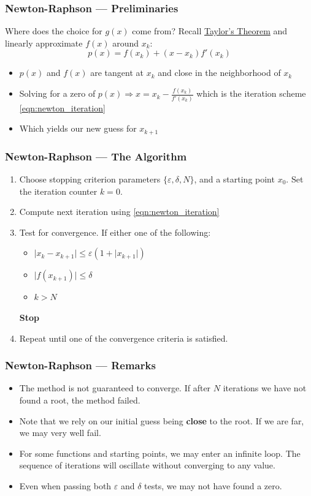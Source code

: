 \documentclass[11pt,xcolor={svgnames},aspectratio=169,usepdftitle=false,notheorems]{beamer}
\begin{document}
\begin{frame}
  \frametitle{Newton-Raphson --- Preliminaries}
Where does the choice for $g(x)$ come from? Recall \href{https://en.wikipedia.org/wiki/Taylor's_theorem}{Taylor's Theorem} and linearly approximate $f(x)$ around $x_k$:
\[
p(x) = f(x_k) + (x - x_k)f'(x_k)
\]
\begin{itemize}
  \item $p(x)$ and $f(x)$ are tangent at $x_k$ and close in the neighborhood of $x_k$
  \item Solving for a zero of $p(x) \Rightarrow x = x_k - \frac{f(x_k)}{f'(x_k)}$ which is the iteration scheme \eqref{eqn:newton_iteration}
  \item Which yields our new guess for $x_{k+1}$
\end{itemize}
\end{frame}

\begin{frame}
  \frametitle{Newton-Raphson --- The Algorithm}
\begin{enumerate}
  \item Choose stopping criterion parameters $\{\varepsilon, \delta, N\}$, and a starting point $x_0$. Set the iteration counter $k = 0$.
  \item Compute next iteration using \eqref{eqn:newton_iteration}
  \item Test for convergence. If either one of the following:
  \begin{itemize}
    \item $\lvert x_k - x_{k+1} \rvert \leq \varepsilon (1 + \lvert x_{k+1}\rvert)$
    \item $\lvert f(x_{k+1}) \rvert \leq \delta$
    \item $k > N$
  \end{itemize}
  \textbf{Stop}
  \item Repeat until one of the convergence criteria is satisfied.
\end{enumerate}
\end{frame}

\begin{frame}
  \frametitle{Newton-Raphson --- Remarks}
\begin{itemize}
  \item The method is not guaranteed to converge. If after $N$ iterations we have not found a root, the method failed.
  \item Note that we rely on our initial guess being \alert{\textbf{close}} to the root. If we are far, we may very well fail.
  \item For some functions and starting points, we may enter an infinite loop. The sequence of iterations will oscillate without converging to any value.
  \item Even when passing both $\varepsilon$ and $\delta$ tests, we may not have found a zero.
\end{itemize}
\end{frame}
\end{document}
